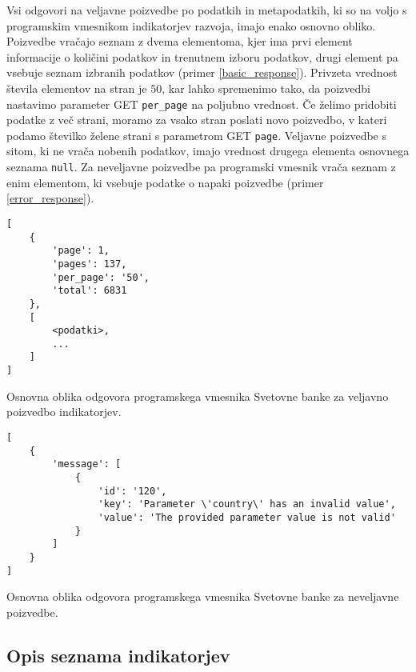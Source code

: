 Vsi odgovori na veljavne poizvedbe po podatkih in metapodatkih, ki so na voljo
s programskim vmesnikom indikatorjev razvoja, imajo enako osnovno obliko. 
Poizvedbe vračajo seznam z dvema elementoma, kjer ima prvi element 
informacije o količini podatkov in trenutnem izboru podatkov, drugi element 
pa vsebuje seznam izbranih podatkov (primer \ref{basic_response}). Privzeta
vrednost števila elementov na stran je $50$, kar lahko spremenimo tako, da
poizvedbi nastavimo parameter GET \verb|per_page| na poljubno vrednost. Če
želimo pridobiti podatke z več strani, moramo za vsako stran poslati novo
poizvedbo, v kateri podamo številko želene strani s parametrom GET \verb|page|.
Veljavne poizvedbe s sitom, ki ne vrača nobenih podatkov, imajo vrednost 
drugega elementa osnovnega seznama \verb|null|.
Za neveljavne poizvedbe pa programski vmesnik vrača seznam z enim elementom,
ki vsebuje podatke o napaki poizvedbe (primer \ref{error_response}).


\begin{snippet}
\begin{center}
\begin{lstlisting}
[
    {
        'page': 1,
        'pages': 137,
        'per_page': '50',
        'total': 6831
    },
    [
        <podatki>,
        ...
    ]
]
\end{lstlisting}
\end{center}
\caption{Osnovna oblika odgovora programskega vmesnika Svetovne banke za
veljavno poizvedbo indikatorjev.} 
\label{basic_response}
\end{snippet} 


\begin{snippet}
\begin{center}
\begin{lstlisting}
[
    {
        'message': [
            {
                'id': '120',
                'key': 'Parameter \'country\' has an invalid value',
                'value': 'The provided parameter value is not valid'
            }
        ]
    }
]
\end{lstlisting}
\end{center}
\caption{Osnovna oblika odgovora programskega vmesnika Svetovne banke za
neveljavne poizvedbe.}
\label{error_response}
\end{snippet} 


\subsection{Opis seznama indikatorjev}

